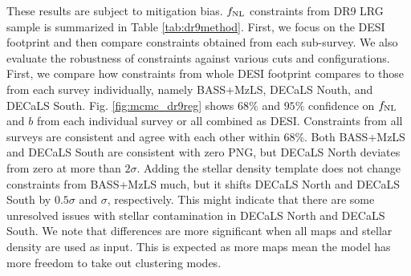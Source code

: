 These results are subject to mitigation bias. $f_{\rm NL}$ constraints from DR9 LRG sample is summarized in Table \ref{tab:dr9method}. First, we focus on the DESI footprint and then compare constraints obtained from each sub-survey. We also evaluate the robustness of constraints against various cuts and configurations. First, we compare how constraints from whole DESI footprint compares to those from each survey individually, namely BASS+MzLS, DECaLS Nouth, and DECaLS South. Fig. \ref{fig:mcmc_dr9reg} shows $68\%$ and $95\%$ confidence on $f_{\rm NL}$ and $b$ from each individual survey or all combined as DESI. Constraints from all surveys are consistent and agree with each other within $68\%$. Both BASS+MzLS and DECaLS South are consistent with zero PNG, but DECaLS North deviates from zero at more than $2\sigma$. Adding the stellar density template does not change constraints from BASS+MzLS much, but it shifts DECaLS North and DECaLS South by $0.5\sigma$ and $\sigma$, respectively. This might indicate that there are some unresolved issues with stellar contamination in DECaLS North and DECaLS South. We note that differences are more significant when all maps and stellar density are used as input. This is expected as more maps mean the model has more freedom to take out clustering modes.


